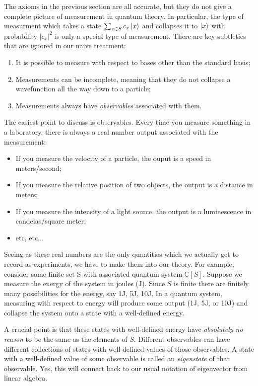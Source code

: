 \documentclass{article}
\theoremstyle{definition}
\newcommand{\CC}{\mathbb{C}}
\newcommand{\0}{\left|0\right>}
\newcommand{\1}{\left|1\right>}
\numberwithin{figure}{section}
\begin{document}
The axioms in the previous section are all accurate, but they do not give a complete picture of measurement in quantum theory. In particular, the type of measurment which takes a state $\sum_{x\in S}c_x \ket{x}$ and collapses it to $\ket{x}$ with probability $|c_x|^2$ is only a special type of measurement. There are key subtleties that are ignored in our naive treatment:

\begin{enumerate}
\item It is possible to measure with respect to bases other than the standard basis;
\item Measurements can be incomplete, meaning that they do not collapse a wavefunction all the way down to a particle;
\item Measurements always have \textit{observables} associated with them.
\end{enumerate}

The easiest point to discuss is observables. Every time you measure something in a laboratory, there is always a real number output associated with the measurement:

\begin{itemize}
\item If you measure the velocity of a particle, the ouput is a speed in meters/second;
\item If you measure the relative position of two objects, the output is a distance in meters;
\item If you measure the intensity of a light source, the output is a luminescence in candelas/square meter;
\item etc, etc...
\end{itemize}

Seeing as these real numbers are the only quantities which we actually get to record as experiments, we have to make them into our theory. For example, consider some finite set S with associated quantum system $\CC[S]$. Suppose we measure the energy of the system in joules (J). Since $S$ is finite there are finitely many possibilities for the energy, say 1J, 5J, 10J. In a quantum system, measuring with respect to energy will produce some output (1J, 5J, or 10J) and collapse the system onto a state with a well-defined energy.

A crucial point is that these states with well-defined energy have \textit{absolutely no reason} to be the same as the elements of $S$. Different observables can have different collections of states with well-defined values of those observables. A state with a well-defined value of some observable is called an \textit{eigenstate} of that observable. Yes, this will connect back to our usual notation of eigenvector from linear algebra.
\end{document}
